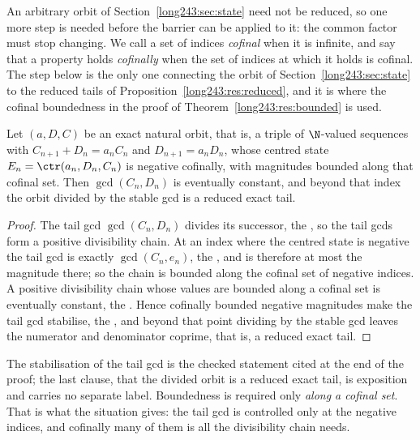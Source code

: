 An arbitrary orbit of Section~\ref{long243:sec:state} need not be reduced, so one more step is needed
before the barrier can be applied to it: the common factor must stop changing.
We call a set of indices \emph{cofinal} when it is infinite, and say that a
property holds \emph{cofinally} when the set of indices at which it holds is
cofinal.  The step below is the only one connecting the orbit of
Section~\ref{long243:sec:state} to the reduced tails of
Proposition~\ref{long243:res:reduced}, and it is where the cofinal boundedness in the
proof of Theorem~\ref{long243:res:bounded} is used.

\begin{proposition}\label{long243:res:gcdstab}
Let $(a,D,C)$ be an exact natural orbit, that is, a triple of $\N$-valued
sequences with $C_{n+1}+D_n=a_nC_n$ and $D_{n+1}=a_nD_n$, whose centred state
$E_n=\ctr(a_n,D_n,C_n)$ is negative cofinally, with magnitudes bounded along
that cofinal set.  Then
$\gcd(C_n,D_n)$ is eventually constant, and beyond that index the orbit divided
by the stable gcd is a reduced exact tail.
\end{proposition}

\begin{proof}
The tail gcd $\gcd(C_n,D_n)$ divides its successor, the
, so the tail gcds form a positive divisibility chain.  At an
index where the centred state is negative the tail gcd is exactly
$\gcd(C_n,e_n)$, the
, and is therefore at most the magnitude there; so the
chain is bounded along the cofinal set of negative indices.  A positive
divisibility chain whose values are bounded along a cofinal set is eventually
constant, the
.  Hence cofinally bounded negative magnitudes make the tail gcd
stabilise, the
, and beyond that point dividing by the stable gcd leaves the
numerator and denominator coprime, that is, a reduced exact tail.
\end{proof}

\noindent The stabilisation of the tail gcd is the checked statement cited at
the end of the proof; the last clause, that the divided orbit is a reduced
exact tail, is exposition and carries no separate label.  Boundedness is
required only \emph{along a cofinal set}.  That is what the situation gives:
the tail gcd is
controlled only at the negative indices, and cofinally many of them is all the
divisibility chain needs.

